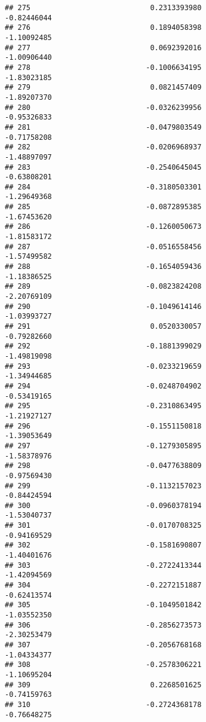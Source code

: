 \documentclass[
]{article}
\begin{document}
\begin{verbatim}
## 275                            0.2313393980                -0.82446044
## 276                            0.1894058398                -1.10092485
## 277                            0.0692392016                -1.00906440
## 278                           -0.1006634195                -1.83023185
## 279                            0.0821457409                -1.89207370
## 280                           -0.0326239956                -0.95326833
## 281                           -0.0479803549                -0.71758208
## 282                           -0.0206968937                -1.48897097
## 283                           -0.2540645045                -0.63808201
## 284                           -0.3180503301                -1.29649368
## 285                           -0.0872895385                -1.67453620
## 286                           -0.1260050673                -1.81583172
## 287                           -0.0516558456                -1.57499582
## 288                           -0.1654059436                -1.18386525
## 289                           -0.0823824208                -2.20769109
## 290                           -0.1049614146                -1.03993727
## 291                            0.0520330057                -0.79282660
## 292                           -0.1881399029                -1.49819098
## 293                           -0.0233219659                -1.34944685
## 294                           -0.0248704902                -0.53419165
## 295                           -0.2310863495                -1.21927127
## 296                           -0.1551150818                -1.39053649
## 297                           -0.1279305895                -1.58378976
## 298                           -0.0477638809                -0.97569430
## 299                           -0.1132157023                -0.84424594
## 300                           -0.0960378194                -1.53040737
## 301                           -0.0170708325                -0.94169529
## 302                           -0.1581690807                -1.40401676
## 303                           -0.2722413344                -1.42094569
## 304                           -0.2272151887                -0.62413574
## 305                           -0.1049501842                -1.03552350
## 306                           -0.2856273573                -2.30253479
## 307                           -0.2056768168                -1.04334377
## 308                           -0.2578306221                -1.10695204
## 309                            0.2268501625                -0.74159763
## 310                           -0.2724368178                -0.76648275

\end{verbatim}
\end{document}
